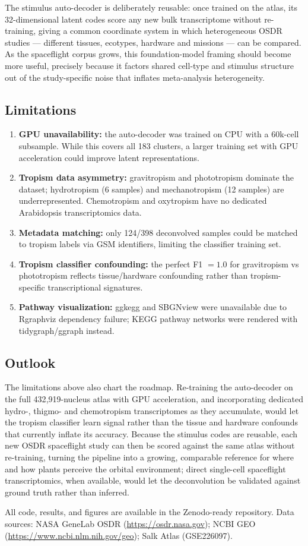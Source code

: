 \documentclass[pdflatex,sn-nature]{sn-jnl}
\begin{document}
The stimulus auto-decoder is deliberately reusable: once trained on the atlas, its
32-dimensional latent codes score any new bulk transcriptome without re-training,
giving a common coordinate system in which heterogeneous OSDR studies --- different
tissues, ecotypes, hardware and missions --- can be compared. As the spaceflight
corpus grows, this foundation-model framing should become more useful, precisely
because it factors shared cell-type and stimulus structure out of the study-specific
noise that inflates meta-analysis heterogeneity.

\subsection{Limitations}
\begin{enumerate}
  \item \textbf{GPU unavailability:} the auto-decoder was trained on CPU with a
    60k-cell subsample. While this covers all 183 clusters, a larger training set
    with GPU acceleration could improve latent representations.
  \item \textbf{Tropism data asymmetry:} gravitropism and phototropism dominate the
    dataset; hydrotropism (6 samples) and mechanotropism (12 samples) are
    underrepresented. Chemotropism and oxytropism have no dedicated Arabidopsis
    transcriptomics data.
  \item \textbf{Metadata matching:} only 124/398 deconvolved samples could be
    matched to tropism labels via GSM identifiers, limiting the classifier training
    set.
  \item \textbf{Tropism classifier confounding:} the perfect F1 \(= 1.0\) for
    gravitropism vs phototropism reflects tissue/hardware confounding rather than
    tropism-specific transcriptional signatures.
  \item \textbf{Pathway visualization:} ggkegg and SBGNview were unavailable due to
    Rgraphviz dependency failure; KEGG pathway networks were rendered with
    tidygraph/ggraph instead.
\end{enumerate}

\subsection{Outlook}
The limitations above also chart the roadmap. Re-training the auto-decoder on the full
432{,}919-nucleus atlas with GPU acceleration, and incorporating dedicated hydro-,
thigmo- and chemotropism transcriptomes as they accumulate, would let the tropism
classifier learn signal rather than the tissue and hardware confounds that currently
inflate its accuracy. Because the stimulus codes are reusable, each new OSDR spaceflight
study can then be scored against the same atlas without re-training, turning the pipeline
into a growing, comparable reference for where and how plants perceive the orbital
environment; direct single-cell spaceflight transcriptomics, when available, would let
the deconvolution be validated against ground truth rather than inferred.

\backmatter

All code, results, and figures are available in the Zenodo-ready repository. Data
sources: NASA GeneLab OSDR (\url{https://osdr.nasa.gov}); NCBI GEO
(\url{https://www.ncbi.nlm.nih.gov/geo}); Salk Atlas (GSE226097).


\end{document}
